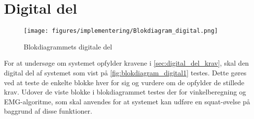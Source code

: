 \section{Digital del}
\begin{figure}[H]
\centering
\texttt{[image: figures/implementering/Blokdiagram\_digital.png]}
\caption{Blokdiagrammets digitale del}
\label{fig:blokdiagram_digital1}
\end{figure}

For at undersøge om systemet opfylder kravene i \autoref{sec:digital_del_krav}, skal den digital del af systemet som vist på \autoref{fig:blokdiagram_digital1} testes. Dette gøres ved at teste de enkelte blokke hver for sig og vurdere om de opfylder de stillede krav. Udover de viste blokke i blokdiagrammet testes der for vinkelberegning og EMG-algoritme, som skal anvendes for at systemet kan udføre en squat-øvelse på baggrund af disse funktioner.   